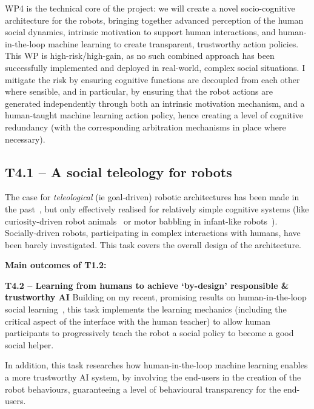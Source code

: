 \documentclass[11pt,a4paper]{report}
\begin{document}
WP4 is the technical core of the project: we will create a
novel socio-cognitive architecture for the robots, bringing together advanced
perception of the human social dynamics, intrinsic motivation to support human
interactions, and human-in-the-loop machine learning to create transparent,
trustworthy action policies. This WP is high-risk/high-gain, as no such combined
approach has been successfully implemented and deployed in real-world, complex
social situations. I mitigate the risk by ensuring cognitive functions are
decoupled from each other where sensible, and in particular, by ensuring that
the robot actions are generated independently through both an intrinsic
motivation mechanism, and a human-taught machine learning action policy, hence
creating a level of cognitive redundancy (with the corresponding arbitration
mechanisms in place where necessary).




\subsection{T4.1 -- A social teleology for robots}
The case for \emph{teleological} (ie goal-driven) robotic architectures has been
made in the past~\cite{wrede2012towards}, but only effectively realised for
relatively simple cognitive systems (like curiosity-driven robot
animals~\cite{oudeyer2005playground} or motor babbling in infant-like
robots~\cite{forestier2017unified}). Socially-driven robots, participating in
complex interactions with humans, have been barely investigated. This task
covers the overall design of the architecture.

\begin{framed}
    {\bf Main outcomes of T1.2:}
\end{framed}

\textbf{T4.2 -- Learning from humans to achieve `by-design' responsible \&
trustworthy AI} Building on my recent, promising results on human-in-the-loop
social learning~\cite{senft2017supervised,senft2019teaching,winkle2020couch}, this task
implements the learning mechanics (including the critical aspect of the
interface with the human teacher) to allow human participants to progressively
teach the robot a social policy to become a good social helper.

In addition, this task researches how human-in-the-loop machine learning enables a more
trustworthy AI system, by involving the end-users in the creation of the robot
behaviours, guaranteeing a level of behavioural transparency for the end-users.
\end{document}
